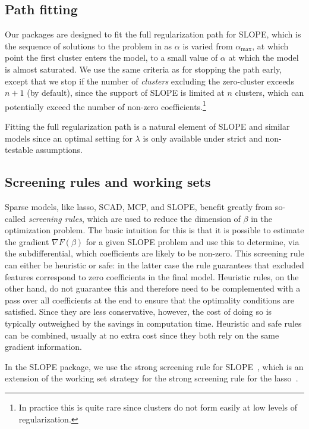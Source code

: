 \documentclass[article]{jss}
\let\Cref\crtCref
\begin{document}
\subsection{Path fitting}

Our packages are designed to fit the full regularization path for SLOPE, which
is the sequence of solutions to the problem in \Cref{eq:slope} as \(\alpha\) is varied
from \(\alpha_\text{max}\), at which point the first cluster enters the model,
to a small value of \(\alpha\) at which the model is almost saturated.
We use the same criteria as \citet{friedman2010} for stopping the path early,
except that we stop if the number of \emph{clusters} excluding the zero-cluster
exceeds \(n + 1\) (by default), since the support of SLOPE is limited at \(n\) clusters,
which can potentially exceed the number of non-zero coefficients.\footnote{In practice
  this is quite rare since clusters do not form easily at low levels of regularization.}

Fitting the full regularization path is a natural element of SLOPE and similar
models since an optimal setting for \(\lambda\) is only available under
strict and non-testable assumptions.

\subsection{Screening rules and working sets}

Sparse models, like lasso, SCAD, MCP, and SLOPE, benefit greatly from
so-called \emph{screening rules}, which are used to reduce the dimension of
\(\beta\) in the optimization problem. The basic intuition for this is that
it is possible to estimate the gradient \(\nabla F(\beta) \) for a given SLOPE problem
and use this to determine, via the subdifferential, which coefficients are
likely to be non-zero. This screening rule can either be heuristic or safe:
in the latter case the rule guarantees that excluded features correspond
to zero coefficients in the final model. Heuristic rules, on the other hand,
do not guarantee this and therefore need to be complemented with a pass
over all coefficients at the end to ensure that the optimality conditions
are satisfied. Since they are less conservative, however, the cost of
doing so is typically outweighed by the savings in computation time.
Heuristic and safe rules can be combined, usually at no extra cost since
they both rely on the same gradient information.

In the SLOPE package, we use the strong screening rule for
SLOPE~\citep{larsson2020a}, which is an extension of the working set strategy
for the strong screening rule for the lasso~\citep{tibshirani2012}.
\end{document}
